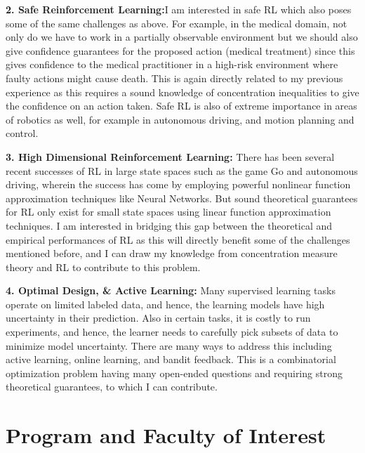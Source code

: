 \documentclass{article}
\begin{document}
\textbf{2. Safe Reinforcement Learning:}I am interested in safe RL which also poses some of the same challenges as above. For example, in the medical domain, not only do we have to work in a partially observable environment but we should also give confidence guarantees for the proposed action (medical treatment) since this gives confidence to the medical
practitioner in a high-risk environment where faulty actions might cause death. This is again directly related to my previous experience as this requires a sound knowledge of concentration inequalities to give the confidence on an action taken. Safe RL is also of extreme importance in areas of robotics as well, for example in autonomous driving,
and motion planning and control.


\textbf{3. High Dimensional Reinforcement Learning:} There has been several recent successes of RL in large state spaces such as the game Go and autonomous driving, wherein the success has come by employing powerful nonlinear function approximation techniques like Neural Networks. But sound theoretical guarantees for RL only exist
for small state spaces using linear function approximation techniques. I am interested in bridging this gap between the theoretical and empirical performances of RL as this will directly benefit some of the challenges mentioned before, and I can draw my knowledge from concentration measure theory and RL to contribute to this problem.


\textbf{4. Optimal Design, \& Active Learning:} Many supervised learning tasks operate on limited labeled data, and hence, the learning models have high uncertainty in their prediction. Also in certain tasks, it is costly to run experiments, and hence, the learner needs to carefully pick subsets of data to minimize model uncertainty. There are many ways to address this including active learning, online learning, and bandit feedback. This is a combinatorial optimization problem having many open-ended questions and requiring strong theoretical guarantees,  to which I can contribute.


\vspace*{-2em}
\section{Program and Faculty of Interest}
\vspace*{-1em}
\end{document}
